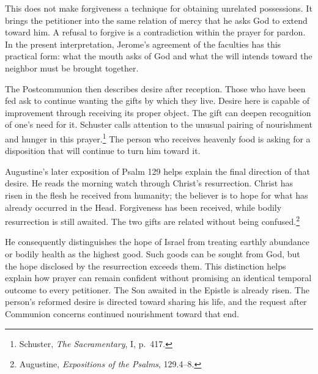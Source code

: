 This does not make forgiveness a technique for obtaining unrelated possessions. It brings the petitioner into the same relation of mercy that he asks God to extend toward him. A refusal to forgive is a contradiction within the prayer for pardon. In the present interpretation, Jerome's agreement of the faculties has this practical form: what the mouth asks of God and what the will intends toward the neighbor must be brought together.

The Postcommunion then describes desire after reception. Those who have been fed ask to continue wanting the gifts by which they live. Desire here is capable of improvement through receiving its proper object. The gift can deepen recognition of one's need for it. Schuster calls attention to the unusual pairing of nourishment and hunger in this prayer.\footnote{Schuster, \textit{The Sacramentary}, I, p.~417.} The person who receives heavenly food is asking for a disposition that will continue to turn him toward it.

Augustine's later exposition of Psalm 129 helps explain the final direction of that desire. He reads the morning watch through Christ's resurrection. Christ has risen in the flesh he received from humanity; the believer is to hope for what has already occurred in the Head. Forgiveness has been received, while bodily resurrection is still awaited. The two gifts are related without being confused.\footnote{Augustine, \textit{Expositions of the Psalms}, 129.4--8.}

He consequently distinguishes the hope of Israel from treating earthly abundance or bodily health as the highest good. Such goods can be sought from God, but the hope disclosed by the resurrection exceeds them. This distinction helps explain how prayer can remain confident without promising an identical temporal outcome to every petitioner. The Son awaited in the Epistle is already risen. The person's reformed desire is directed toward sharing his life, and the request after Communion concerns continued nourishment toward that end.

